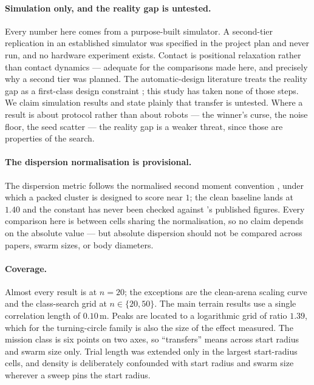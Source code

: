 \documentclass[11pt,a4paper]{article}
\begin{document}
\paragraph{Simulation only, and the reality gap is untested.}
Every number here comes from a purpose-built simulator. A second-tier replication
in an established simulator was specified in the project plan and never run, and
no hardware experiment exists. Contact is positional relaxation rather than
contact dynamics --- adequate for the comparisons made here, and precisely why a
second tier was planned. The automatic-design literature treats
the reality gap as a first-class design constraint
\citep{jakobi1995,francesca2014,ligot2018,birattari2019}; this study has taken
none of those steps. We claim simulation results and state plainly that transfer
is untested. Where a result is about protocol rather than about robots --- the winner's
curse, the noise floor, the seed scatter --- the reality gap is a weaker threat,
since those are properties of the search.

\paragraph{The dispersion normalisation is provisional.}
The dispersion metric follows the normalised second moment convention
\citep{grahamsloane1990}, under which a packed
cluster is designed to score near $1$; the clean baseline lands at $1.40$ and the
constant has never been checked against \citet{gauci2014}'s published figures.
Every comparison here is between cells sharing the normalisation, so no claim
depends on the absolute value --- but absolute dispersion should not be compared
across papers, swarm sizes, or body diameters.

\paragraph{Coverage.}
Almost every result is at $n = 20$; the exceptions are the clean-arena scaling
curve and the class-search grid at $n \in \{20, 50\}$. The main terrain results
use a single correlation length of $0.10$\,m. Peaks are located to a logarithmic
grid of ratio $1.39$, which for the turning-circle family is also the size of the
effect measured. The mission class is six points on two axes, so ``transfers''
means across start radius and swarm size only. Trial length was extended only in
the largest start-radius cells, and density is deliberately confounded with start
radius and swarm size wherever a sweep pins the start radius.
\end{document}
